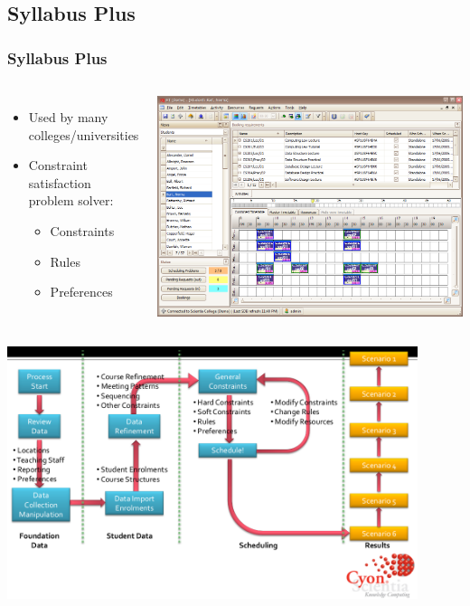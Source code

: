 \documentclass{beamer}
\begin{document}
\subsection{Syllabus Plus}
\begin{frame}
	\frametitle{Syllabus Plus}
	\begin{columns}%
    \begin{itemize}
		\item Used by many colleges/universities
		\item Constraint satisfaction problem solver:
		\begin{itemize}
			\item Constraints 
			\item Rules
			\item Preferences
		\end{itemize}
	\end{itemize}
    \includegraphics[width=\textwidth]{SyllabusPlus.png}
    \end{columns}	
\end{frame}

\begin{frame}
    \includegraphics[width=0.9\textwidth]{SyllabusPlusFlow.png}
\end{frame}
\end{document}
